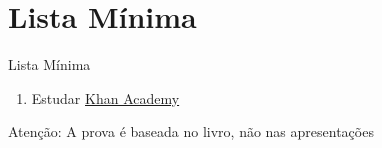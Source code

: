 \documentclass[fleqn,aspectratio=169,12pt]{beamer}
\begin{document}
\section{Lista Mínima}

\begin{frame}{Lista Mínima}
  \begin{enumerate}
    \item Estudar \href{https://pt.khanacademy.org}{Khan Academy}
  \end{enumerate}

  \vfill
  Atenção: A prova é baseada no livro, não nas apresentações
\end{frame}

\end{document}
